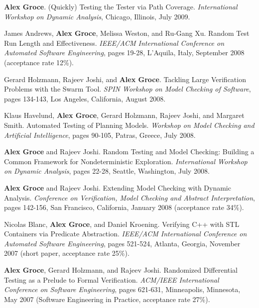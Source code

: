 \documentclass[ComputerScience]{vita}
\begin{document}
\begin{vita}
\begin{Refereed Conference and Workshop Publications}
\item
{\bf Alex Groce}.
\newblock (Quickly) Testing the Tester via Path Coverage.
\newblock \emph{International Workshop on Dynamic Analysis}, Chicago, Illinois, July 2009.

\item
James Andrews, {\bf Alex Groce}, Melissa Weston, and Ru-Gang Xu.
\newblock Random Test Run Length and Effectiveness.
\newblock \emph{IEEE/ACM International Conference on Automated Software Engineering}, pages 19-28, L'Aquila, Italy, September 2008 (acceptance rate 12\%).

\item
Gerard Holzmann, Rajeev Joshi, and {\bf Alex Groce}.
\newblock Tackling Large Verification Problems with the Swarm Tool.
\newblock \emph{SPIN Workshop on Model Checking of Software}, pages 134-143, Los Angeles, California, August 2008.

\item
Klaus Havelund, {\bf Alex Groce}, Gerard Holzmann, Rajeev Joshi, and Margaret Smith.
\newblock Automated Testing of Planning Models.
\newblock \emph{Workshop on Model Checking and Artificial Intelligence}, pages 90-105, Patras, Greece, July 2008.

\item
{\bf Alex Groce} and Rajeev Joshi.
\newblock Random Testing and Model Checking:   Building a Common Framework for Nondeterministic Exploration.
\newblock \emph{International Workshop on Dynamic Analysis}, pages 22-28, Seattle, Washington, July 2008.

\item
{\bf Alex Groce} and Rajeev Joshi.
\newblock Extending Model Checking with Dynamic Analysis.
\newblock \emph{Conference on Verification, Model Checking and Abstract Interpretation}, pages 142-156, San Francisco, California, January 2008 (acceptance rate 34\%).

\item
Nicolas Blanc, {\bf Alex Groce}, and Daniel Kroening.
\newblock Verifying C++ with STL Containers via Predicate Abstraction.
\newblock \emph{IEEE/ACM International Conference on Automated Software Engineering}, pages 521-524, Atlanta, Georgia, November 2007 (short paper, acceptance rate 25\%).

\item
{\bf Alex Groce}, Gerard Holzmann, and Rajeev Joshi.
\newblock Randomized Differential Testing as a Prelude to Formal Verification.
\newblock \emph{ACM/IEEE International Conference on Software Engineering}, pages 621-631, Minneapolis, Minnesota, May 2007 (Software Engineering in Practice, acceptance rate 27\%).


\end{Refereed Conference and Workshop Publications}
\end{vita}
\end{document}
